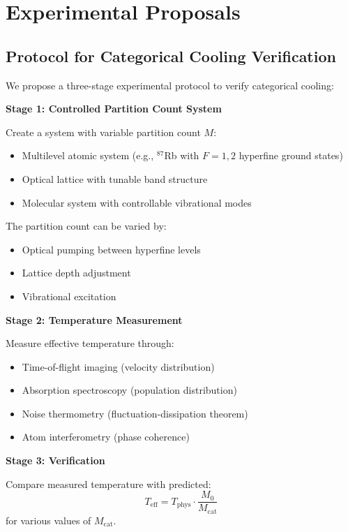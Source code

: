 \documentclass[twocolumn,10pt,twoside]{article}
\newcommand{\Teff}{T_{\mathrm{eff}}}
\newcommand{\Tphys}{T_{\mathrm{phys}}}
\newcommand{\Mcat}{M_{\mathrm{cat}}}
\begin{document}
\section{Experimental Proposals}

\subsection{Protocol for Categorical Cooling Verification}

We propose a three-stage experimental protocol to verify categorical cooling:

\textbf{Stage 1: Controlled Partition Count System}

Create a system with variable partition count $M$:
\begin{itemize}
    \item Multilevel atomic system (e.g., $^{87}$Rb with $F = 1, 2$ hyperfine ground states)
    \item Optical lattice with tunable band structure
    \item Molecular system with controllable vibrational modes
\end{itemize}

The partition count can be varied by:
\begin{itemize}
    \item Optical pumping between hyperfine levels
    \item Lattice depth adjustment
    \item Vibrational excitation
\end{itemize}

\textbf{Stage 2: Temperature Measurement}

Measure effective temperature through:
\begin{itemize}
    \item Time-of-flight imaging (velocity distribution)
    \item Absorption spectroscopy (population distribution)
    \item Noise thermometry (fluctuation-dissipation theorem)
    \item Atom interferometry (phase coherence)
\end{itemize}

\textbf{Stage 3: Verification}

Compare measured temperature with predicted:
\begin{equation}
\Teff = \Tphys \cdot \frac{M_0}{\Mcat}
\end{equation}
for various values of $\Mcat$.
\end{document}
